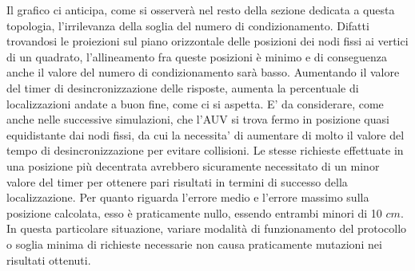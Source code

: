 \documentclass[Lau,binding=0.6cm]{sapthesis}
\begin{document}
Il grafico ci anticipa, come si osserverà nel resto della sezione dedicata a questa topologia, l'irrilevanza della soglia del numero di condizionamento. Difatti trovandosi le proiezioni sul piano orizzontale delle posizioni dei nodi fissi ai vertici di un quadrato, l'allineamento fra queste posizioni è minimo e di conseguenza anche il valore del numero di condizionamento sarà basso. Aumentando il valore del timer di desincronizzazione delle risposte, aumenta la percentuale di localizzazioni andate a buon fine, come ci si aspetta. E' da considerare, come anche nelle successive simulazioni, che l'AUV si trova fermo in posizione quasi equidistante dai nodi fissi, da cui la necessita' di aumentare di molto il valore del tempo di desincronizzazione per evitare collisioni. Le stesse richieste effettuate in una posizione più decentrata avrebbero sicuramente necessitato di un minor valore del timer per ottenere pari risultati in termini di successo della localizzazione.
Per quanto riguarda l'errore medio e l'errore massimo sulla posizione calcolata, esso è praticamente nullo, essendo entrambi minori di 10 $cm$.
In questa particolare situazione, variare modalità di funzionamento del protocollo o soglia minima di richieste necessarie non causa praticamente mutazioni nei risultati ottenuti.

\begin{figure}[H]
    \centering
    \hfill
\end{figure}
\end{document}

